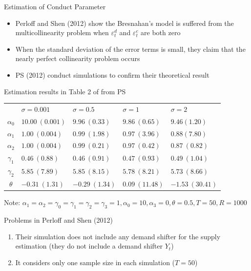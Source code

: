 \documentclass[aspectratio = 169]{beamer}
\theoremstyle{definition}
\begin{document}
\begin{frame}{Estimation of Conduct Parameter}
    \begin{itemize}
        \item Perloff and Shen (2012) show the Bresnahan's model is suffered from the multicollinearity problem         
        when $\varepsilon^{d}_{t}$ and $\varepsilon^{c}_{t}$ are both zero
        \item When the standard deviation of the error terms is small, they claim that the nearly perfect collinearity problem occurs
        \item PS (2012) conduct simulations to confirm their theoretical result
    \end{itemize}
\end{frame}

\begin{frame}{Estimation results in Table 2 of from PS}
    \begin{table}[!htbp]
    \label{tb:linear_linear_sigma_Perloff_Shen}
    \begin{center}
        \begin{tabular}{cllll}
            \hline
            & $\sigma=0.001$ & $\sigma=0.5$ & $\sigma=1$ & $\sigma=2$ \\
            $\alpha_0$ & $10.00\ (0.001)$ & $9.96\ (0.33)$ & $9.86\ (0.65)$ & $9.46 (1.20)$ \\
            $\alpha_1$ & $1.00\ (0.004)$ & $0.99\ (1.98)$ & $0.97\ (3.96)$ & $0.88 (7.80)$ \\
            $\alpha_2$ & $1.00\ (0.004)$ & $0.99\ (0.21)$ & $0.97\ (0.42)$ & $0.87\ (0.82)$ \\
            $\gamma_1$ & $0.46\ (0.88)$ & $0.46\ (0.91)$ & $0.47\ (0.93)$ & $0.49\ (1.04)$ \\
            $\gamma_2$ & $5.85\ (7.89)$ & $5.85\ (8.15)$ & $5.78\ (8.21)$ & $5.73\ (8.66)$ \\
            $\theta$ & $-0.31\ (1.31)$ & $-0.29\ (1.34)$ & $0.09\ (11.48)$ & $-1.53\ (30.41)$ \\
            \hline
        \end{tabular}
    \end{center}\footnotesize
    Note: $\alpha_1 = \alpha_2 = \gamma_0 = \gamma_1 = \gamma_2  = \gamma_3 = 1, \alpha_0 = 10, \alpha_3 = 0,  \theta = 0.5, T = 50, R = 1000$
    \end{table}
\end{frame}


\begin{frame}{Problems in Perloff and Shen (2012)}
    \begin{enumerate}
        \item Their simulation does not include any demand shifter for the supply estimation (they do not include a demand shifter $Y_t$)
        \item It considers only one sample size in each simulation ($T = 50$) 
    \end{enumerate}
\end{frame}
\end{document}
